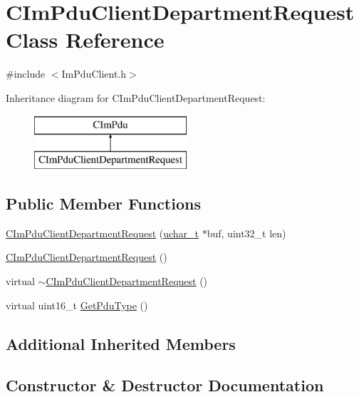 \hypertarget{class_c_im_pdu_client_department_request}{}\section{C\+Im\+Pdu\+Client\+Department\+Request Class Reference}
\label{class_c_im_pdu_client_department_request}


{\ttfamily \#include $<$Im\+Pdu\+Client.\+h$>$}

Inheritance diagram for C\+Im\+Pdu\+Client\+Department\+Request\+:\begin{figure}[H]
\begin{center}
\leavevmode
\includegraphics[height=2.000000cm]{class_c_im_pdu_client_department_request}
\end{center}
\end{figure}
\subsection*{Public Member Functions}
\begin{DoxyCompactItemize}
\item 
\hyperlink{class_c_im_pdu_client_department_request_aa30f93c78871e466c5edf20421ecb9d9}{C\+Im\+Pdu\+Client\+Department\+Request} (\hyperlink{base_2ostype_8h_a124ea0f8f4a23a0a286b5582137f0b8d}{uchar\+\_\+t} $\ast$buf, uint32\+\_\+t len)
\item 
\hyperlink{class_c_im_pdu_client_department_request_a290bc82a8b181e9e0d89053a3192d06a}{C\+Im\+Pdu\+Client\+Department\+Request} ()
\item 
virtual \hyperlink{class_c_im_pdu_client_department_request_ad5a8902da00c32477bb9d06df7bee588}{$\sim$\+C\+Im\+Pdu\+Client\+Department\+Request} ()
\item 
virtual uint16\+\_\+t \hyperlink{class_c_im_pdu_client_department_request_ad6f39744032b57fdb9aeeb4022ef82fc}{Get\+Pdu\+Type} ()
\end{DoxyCompactItemize}
\subsection*{Additional Inherited Members}


\subsection{Constructor \& Destructor Documentation}
\hypertarget{class_c_im_pdu_client_department_request_aa30f93c78871e466c5edf20421ecb9d9}{}
